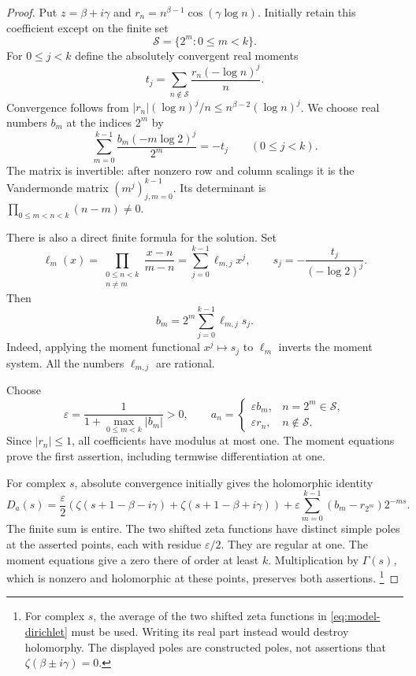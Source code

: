 \begin{proof}
Put \(z=\beta+i\gamma\) and
\(r_n=n^{\beta-1}\cos(\gamma\log n)\). Initially retain this
coefficient except on the finite set
\[
 \mathcal S=\{2^m:0\le m<k\}.
\]
For \(0\le j<k\) define the absolutely convergent real moments
\[
 t_j=\sum_{n\notin\mathcal S}
              \frac{r_n(-\log n)^j}{n}.
\]
Convergence follows from
\(|r_n|(\log n)^j/n\le n^{\beta-2}(\log n)^j\).
We choose real numbers \(b_m\) at the indices \(2^m\) by
\begin{equation}\label{eq:moment-system}
 \sum_{m=0}^{k-1}\frac{b_m(-m\log2)^j}{2^m}
       =-t_j\qquad(0\le j<k).
\end{equation}
The matrix is invertible: after nonzero row and column
scalings it is the Vandermonde matrix \((m^j)_{j,m=0}^{k-1}\).
Its determinant is
\(\prod_{0\le m<n<k}(n-m)\ne0\).

There is also a direct finite formula for the solution. Set
\[
 \ell_m(x)=\prod_{\substack{0\le n<k\\n\ne m}}
                    \frac{x-n}{m-n}
           =\sum_{j=0}^{k-1}\ell_{m,j}x^j,\qquad
 s_j=-\frac{t_j}{(-\log2)^j}.
\]
Then
\[
 b_m=2^m\sum_{j=0}^{k-1}\ell_{m,j}s_j.
\]
Indeed, applying the moment functional
\(x^j\mapsto s_j\) to \(\ell_m\) inverts the moment system.
All the numbers \(\ell_{m,j}\) are rational.

Choose
\[
 \varepsilon=\frac1{1+\max_{0\le m<k}|b_m|}>0,\qquad
 a_n=\begin{cases}
       \varepsilon b_m,&n=2^m\in\mathcal S,\\
       \varepsilon r_n,&n\notin\mathcal S.
      \end{cases}
\]
Since \(|r_n|\le1\), all coefficients have modulus at most
one. The moment equations prove the first assertion, including
termwise differentiation at one.

For complex \(s\), absolute convergence initially gives the
holomorphic identity
\begin{equation}\label{eq:model-dirichlet}
 D_a(s)=\frac{\varepsilon}{2}
    \left(\zeta(s+1-\beta-i\gamma)
          +\zeta(s+1-\beta+i\gamma)\right)
       +\varepsilon\sum_{m=0}^{k-1}
          (b_m-r_{2^m})2^{-ms}.
\end{equation}
The finite sum is entire. The two shifted zeta functions
have distinct simple poles at the asserted points, each
with residue \(\varepsilon/2\). They are regular at one.
The moment equations give a zero there of order at least
\(k\). Multiplication by \(\Gamma(s)\), which is nonzero
and holomorphic at these points, preserves both assertions.
\footnote{For complex \(s\), the average of the two shifted
zeta functions in \eqref{eq:model-dirichlet} must be used.
Writing its real part instead would destroy holomorphy.
The displayed poles are constructed poles, not assertions
that \(\zeta(\beta\pm i\gamma)=0\).}


\end{proof}
